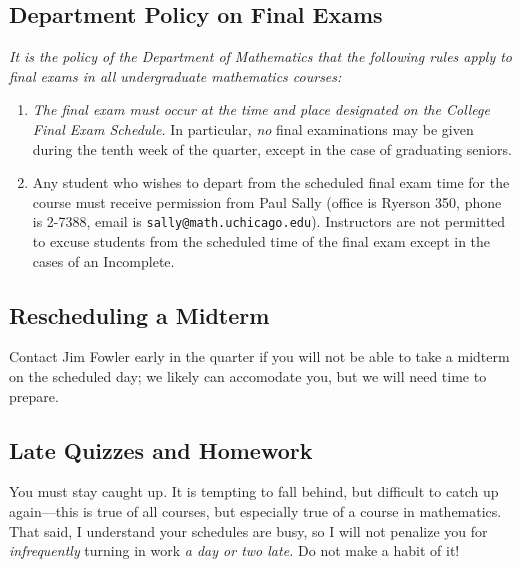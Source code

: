 \documentclass[12pt,letterpaper]{article}
\begin{document}
\subsection*{Department Policy on Final Exams}

\textit{It is the policy of the Department of Mathematics that the
following rules apply to final exams in all undergraduate mathematics
courses:}
\begin{enumerate}
\item \textit{The final exam must occur at the time and place designated on
the College Final Exam Schedule.}  In particular, \textit{no} final examinations
may be given during the tenth week of the quarter, except in the case
of graduating seniors.
\item Any student who wishes to depart from the scheduled final exam
time for the course must receive permission from Paul Sally (office is
Ryerson 350, phone is 2-7388, email is
\texttt{sally@math.uchicago.edu}).  Instructors are not permitted to
excuse students from the scheduled time of the final exam except in
the cases of an Incomplete.
\end{enumerate}

\subsection*{Rescheduling a Midterm}

Contact Jim Fowler early in the quarter if you will not be able to
take a midterm on the scheduled day; we likely can accomodate you, but
we will need time to prepare.

\subsection*{Late Quizzes and Homework}

You must stay caught up.  It is tempting to fall behind, but difficult
to catch up again---this is true of all courses, but especially true
of a course in mathematics.  That said, I understand your schedules
are busy, so I will not penalize you for \textit{infrequently} turning
in work \textit{a day or two late.}  Do not make a habit of it!
\end{document}
